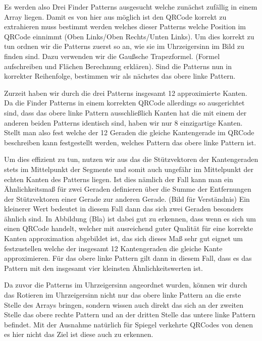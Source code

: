 Es werden also Drei Finder Patterns ausgesucht welche zunächst zufällig in einem Array liegen. Damit es von hier aus möglich ist den QRCode korrekt zu extrahieren muss bestimmt werden welches dieser Patterns welche Position im QRCode einnimmt (Oben Links/Oben Rechts/Unten Links). Um dies korrekt zu tun ordnen wir die Patterns zuerst so an, wie sie im Uhrzeigersinn im Bild zu finden sind. Dazu verwenden wir die Gaußsche Trapezformel. (Formel aufschreiben und Flächen Berechnung erklären). Sind die Patterns nun in korrekter Reihenfolge, bestimmen wir als nächstes das obere linke Pattern.

Zurzeit haben wir durch die drei Patterns insgesamt 12 approximierte Kanten. Da die Finder Patterns in einem korrekten QRCode allerdings so ausgerichtet sind, dass das obere linke Pattern ausschließlich Kanten hat die mit einem der anderen beiden Patterns identisch sind, haben wir nur 8 einzigartige Kanten. Stellt man also fest welche der 12 Geraden die gleiche Kantengerade im QRCode beschreiben kann festgestellt werden, welches Pattern das obere linke Pattern ist.

Um dies effizient zu tun, nutzen wir aus das die Stützvektoren der Kantengeraden stets im  Mittelpunkt der Segmente und somit auch ungefähr im Mittelpunkt der echten Kanten des Patterns liegen. Ist dies nämlich der Fall kann man ein Ähnlichkeitsmaß für zwei Geraden definieren über die Summe der Entfernungen der Stützvektoren einer Gerade zur anderen Gerade. (Bild für Verständnis) Ein kleinerer Wert bedeutet in diesem Fall dann das sich zwei Geraden besonders ähnlich sind. In Abbildung (Bla) ist dabei gut zu erkennen, dass wenn es sich um einen QRCode handelt, welcher mit ausreichend guter Qualität für eine korrekte Kanten approximation abgebildet ist, das sich dieses Maß sehr gut eignet um festzustellen welche der insgesamt 12 Kantengeraden die gleiche Kante approximieren. Für das obere linke Pattern gilt dann in diesem Fall, dass es das Pattern mit den insgesamt vier kleinsten Ähnlichkeitswerten ist.

Da zuvor die Patterns im Uhrzeigersinn angeordnet wurden, können wir durch das Rotieren im Uhrzeigersinn nicht nur das obere linke Pattern an die erste Stelle des Arrays bringen, sondern wissen auch direkt das sich an der zweiten Stelle das obere rechte Pattern und an der dritten Stelle das untere linke Pattern befindet. Mit der Ausnahme natürlich für Spiegel verkehrte QRCodes von denen es hier nicht das Ziel ist diese auch zu erkennen.

